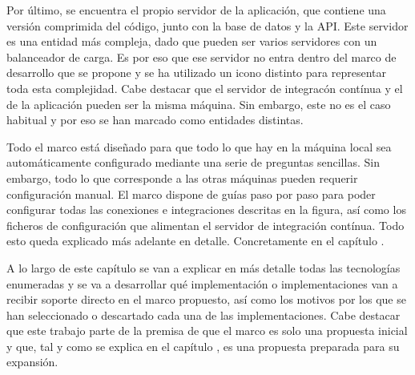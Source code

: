 Por último, se encuentra el propio servidor de la aplicación, que contiene una versión comprimida del código, junto con la base de datos y la API. Este servidor es una entidad más compleja, dado que pueden ser varios servidores con un balanceador de carga. Es por eso que ese servidor no entra dentro del marco de desarrollo que se propone y se ha utilizado un icono distinto para representar toda esta complejidad. Cabe destacar que el servidor de integracón contínua y el de la aplicación pueden ser la misma máquina. Sin embargo, este no es el caso habitual y por eso se han marcado como entidades distintas.

Todo el marco está diseñado para que todo lo que hay en la máquina local sea automáticamente configurado mediante una serie de preguntas sencillas. Sin embargo, todo lo que corresponde a las otras máquinas pueden requerir configuración manual. El marco dispone de guías paso por paso para poder configurar todas las conexiones e integraciones descritas en la figura, así como los ficheros de configuración que alimentan el servidor de integración contínua. Todo esto queda explicado más adelante en detalle. Concretamente en el capítulo .

A lo largo de este capítulo se van a explicar en más detalle todas las tecnologías enumeradas y se va a desarrollar qué implementación o implementaciones van a recibir soporte directo en el marco propuesto, así como los motivos por los que se han seleccionado o descartado cada una de las implementaciones. Cabe destacar que este trabajo parte de la premisa de que el marco es solo una propuesta inicial y que, tal y como se explica en el capítulo , es una propuesta preparada para su expansión.
